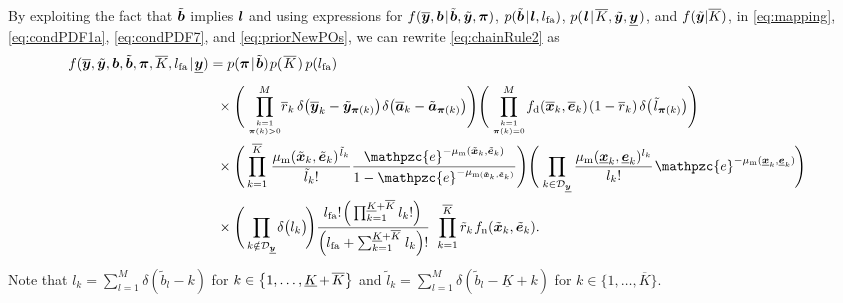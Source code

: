 \documentclass[11pt,a4paper]{article}
\newcommand{\ist}{\hspace*{.3mm}}
\newcommand{\rmv}{\hspace*{-.3mm}}
\newcommand{\cl}[1]{\mathcal{#1}}
\newcommand{\nn}{\nonumber}
\newcommand{\ynew}{\overline{\V{y}}}
\newcommand{\avnew}{\overline{\V{a}}}
\newcommand{\Knew}{\overline{K}}
\newcommand{\xnew}{\overline{\V{x}}}
\newcommand{\enew}{\overline{\V{e}}}
\newcommand{\rnew}{\overline{r}}
\newcommand{\yt}{\tilde{\V{y}}}
\newcommand{\avt}{\tilde{\V{a}}}
\newcommand{\xt}{\tilde{\V{x}}}
\newcommand{\et}{\tilde{\V{e}}}
\newcommand{\rt}{\tilde{r}}
\newcommand{\fd}{f_{\mathrm{d}}}
\begin{document}
By exploiting the fact that $\tilde{\bm{b}}$ implies $\bm{l}$ and using expressions for $ f(\overline{\V{y}}, \V{b} \ist | \ist \tilde{\V{b}},\tilde{\V{y}},\V{\pi})$, $p(\tilde{\V{b}} \ist | \ist \V{l},  l_{\mathrm{fa}}) $, $p( \ist \V{l} \ist | \ist \overline{K}, \tilde{\V{y}}, \underline{\V{y}} \ist)$, and $f(\yt | \Knew)$, in \eqref{eq:mapping}, \eqref{eq:condPDF1a}, \eqref{eq:condPDF7}, and \eqref{eq:priorNewPOs}, we can rewrite \eqref{eq:chainRule2} \vspace{1mm} as
\begin{align}
f(\overline{\V{y}}, \tilde{\V{y}}, \V{b}, \tilde{\V{b}}, \V{\pi}, \overline{K}, l_{\mathrm{fa}} \ist | \ist \underline{\V{y}})  &=  p( \V{\pi} \ist | \ist \tilde{\V{b}})  \ist p( \ist \overline{K} \ist)     \ist\ist p(l_{\mathrm{fa}} )  \nn\\[1.5mm]
&\hspace{2mm}\times  \Bigg(\prod_{k=1 \atop \V{\pi}(k)>0}^M \rmv\rmv\rmv  \rnew_k \ist\ist \delta\big(\ynew_k-\yt_{\V{\pi}(k)}\big) \ist \delta\big(\avnew_k-\avt_{\V{\pi}(k)}\big)\Bigg) \Bigg( \prod_{k=1 \atop \V{\pi}(k)=0}^M \rmv\rmv \fd(\xnew_k,\enew_k) \ist (1-\rnew_k) \hspace{.5mm} \delta\big(\ist  \tilde{l}_{\V{\pi}(k)} \big) \Bigg) \nn\\
&\hspace{2mm}\times\Bigg( \prod^{\overline{K}}_{k= 1} \ist \frac{\mu_{\mathrm{m}}(\tilde{\V{x}}_{k},\tilde{\V{e}}_{k})^{\ist \tilde{l}_{k}}}{\tilde{l}_{k}!} \frac{\mathpzc{e}^{-\mu_{\mathrm{m}}(\tilde{\V{x}}_{k},\tilde{\V{e}}_{k})}}{1-\mathpzc{e}^{-\mu_{\mathrm{m}(\tilde{\V{x}}_{k},\tilde{\V{e}}_{k})}}}\Bigg)  \Bigg ( \ist \prod_{k \in \cl{D}_{\underline{\V{y}}}} \frac{\mu_{\mathrm{m}} (\underline{\V{x}}_k,\underline{\V{e}}_k)^{l_k}}{l_{k}!} \ist \mathpzc{e}^{-\mu_{\mathrm{m}}(\underline{\V{x}}_k,\underline{\V{e}}_k)}  \rmv  \Bigg) \ist \nn\\
&\hspace{2mm}\times \Bigg( \prod_{k \notin \cl{D}_{\underline{\V{y}}}}  \rmv \delta \big(l_{k}\big) \rmv \rmv   \Bigg) \frac{l_{\mathrm{fa}}! \ist \Big(\prod^{\underline{K} + \overline{K}}_{k=1} l_{k} ! \Big) \ist }{\Big( l_{\mathrm{fa}}  + \sum^{\underline{K} + \overline{K}}_{k=1} \ist l_{k}  \Big)!} \hspace{1.3mm} \prod_{k=1}^{\Knew} \rt_k \ist f_{\mathrm{n}}(\xt_k, \et_k). \\[-5mm]
\nn
\end{align}
Note that $l_k = \sum^M_{l=1} \delta(\tilde{b}_l - k)$ for $k \in \big\{1,\dots,\underline{K} \rmv+\rmv \overline{K}\big\}$ and $\tilde{l}_k = \sum^M_{l=1} \delta(\tilde{b}_l - \underline{K} + k)$ for $k \in \big\{1,\dots,\overline{K}\big\}$.
\end{document}
